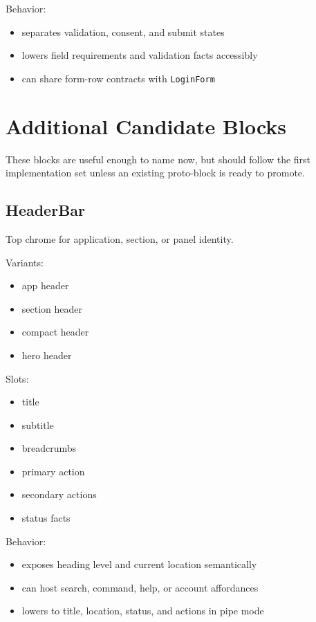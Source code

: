 Behavior:

\begin{itemize}
\tightlist
\item
  separates validation, consent, and submit states
\item
  lowers field requirements and validation facts accessibly
\item
  can share form-row contracts with \texttt{L\allowbreak{}o\allowbreak{}g\allowbreak{}i\allowbreak{}n\allowbreak{}F\allowbreak{}o\allowbreak{}r\allowbreak{}m}
\end{itemize}

\section{Additional Candidate Blocks}\label{record-128-additional-candidate-blocks}

These blocks are useful enough to name now, but should follow the first implementation set unless an existing proto-block is ready to promote.

\subsection{HeaderBar}\label{record-128-headerbar}

Top chrome for application, section, or panel identity.

Variants:

\begin{itemize}
\tightlist
\item
  app header
\item
  section header
\item
  compact header
\item
  hero header
\end{itemize}

Slots:

\begin{itemize}
\tightlist
\item
  title
\item
  subtitle
\item
  breadcrumbs
\item
  primary action
\item
  secondary actions
\item
  status facts
\end{itemize}

Behavior:

\begin{itemize}
\tightlist
\item
  exposes heading level and current location semantically
\item
  can host search, command, help, or account affordances
\item
  lowers to title, location, status, and actions in pipe mode
\end{itemize}

